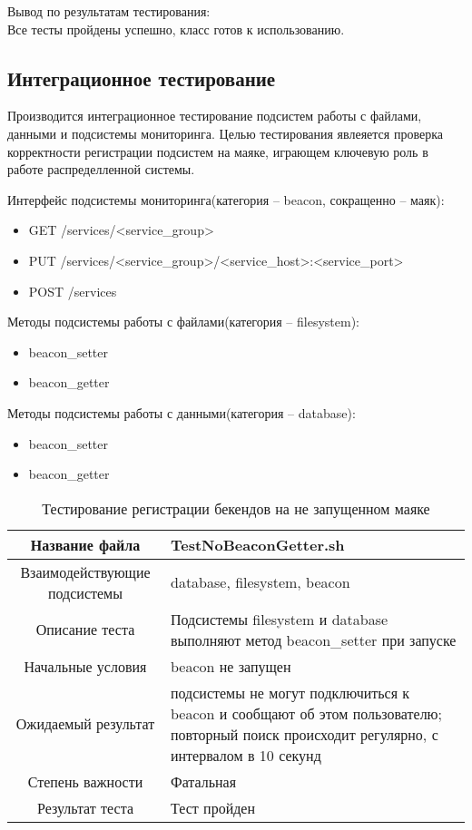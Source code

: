 \documentclass[a4paper,12pt]{report}
\numberwithin{equation}{section}
\begin{document}
Вывод по результатам тестирования:\\
Все тесты пройдены успешно, класс готов к использованию.

\clearpage
\subsection{Интеграционное тестирование}
Производится интеграционное тестирование подсистем работы с файлами, данными и подсистемы мониторинга. Целью тестирования явлеяется проверка
корректности регистрации подсистем на маяке, играющем ключевую роль в работе распределленной системы.

Интерфейс подсистемы мониторинга(категория -- beacon, сокращенно -- маяк):
\begin{itemize}
  \item GET /services/<service\_group>
  \item PUT /services/<service\_group>/<service\_host>:<service\_port>
  \item POST /services
\end{itemize}

Методы подсистемы работы с файлами(категория -- filesystem):
\begin{itemize}
  \item beacon\_setter
  \item beacon\_getter
\end{itemize}

Методы подсистемы работы с данными(категория -- database):
\begin{itemize}
  \item beacon\_setter
  \item beacon\_getter
\end{itemize}

\begin{table}[h]
\caption{Тестирование регистрации бекендов на не запущенном маяке}
\begin{tabu} to \textwidth {|c|X|}
\hline
Название файла & TestNoBeaconGetter.sh \\ \hline
Взаимодействующие подсистемы & database, filesystem, beacon \\ \hline
Описание теста & Подсистемы filesystem и database выполняют метод beacon\_setter при запуске \\ \hline
Начальные условия & beacon не запущен \\
Ожидаемый результат & подсистемы не могут подключиться к beacon и сообщают об этом пользователю; повторный поиск происходит регулярно, с интервалом в 10 секунд \\ \hline
Степень важности & Фатальная \\ \hline
Результат теста & Тест пройден \\ \hline
\end{tabu}
\end{table}
\end{document}
